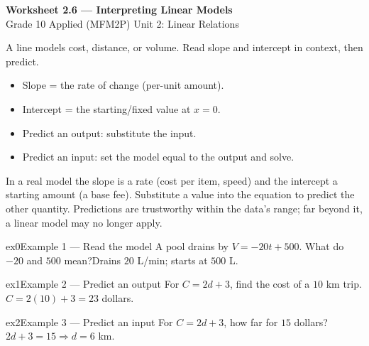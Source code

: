 \documentclass[11pt]{article}
\begin{document}
\begin{center}
{\LARGE\bfseries\color{titleblue}Worksheet 2.6 --- Interpreting Linear Models}\\[2pt]
{\small Grade 10 Applied (MFM2P) \textperiodcentered{} Unit 2: Linear Relations}
\end{center}

\begin{ideabox}
A line models cost, distance, or volume. Read slope and intercept in context, then predict.
\begin{itemize}[leftmargin=*,itemsep=2pt]
  \item Slope = the rate of change (per-unit amount).
  \item Intercept = the starting/fixed value at $x=0$.
  \item Predict an output: substitute the input.
  \item Predict an input: set the model equal to the output and solve.
\end{itemize}
\end{ideabox}

\begin{learnbox}
In a real model the slope is a rate (cost per item, speed) and the intercept a starting amount (a base fee).
Substitute a value into the equation to predict the other quantity.
Predictions are trustworthy within the data's range; far beyond it, a linear model may no longer apply.
\end{learnbox}


\begin{example}{ex0}{Example 1 --- Read the model}
A pool drains by $V=-20t+500$. What do $-20$ and $500$ mean?\soln Drains $20$ L/min; starts at $500$ L.
\end{example}

\begin{example}{ex1}{Example 2 --- Predict an output}
For $C=2d+3$, find the cost of a $10$ km trip.\soln $C=2(10)+3=23$ dollars.
\end{example}

\begin{example}{ex2}{Example 3 --- Predict an input}
For $C=2d+3$, how far for $15$ dollars?\soln $2d+3=15\Rightarrow d=6$ km.
\end{example}
\end{document}

